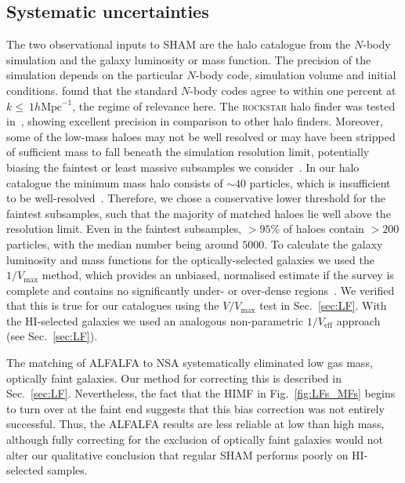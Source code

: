 \documentclass[usenatbib,useAMS]{mnras}
\newcommand{\HI}{\ensuremath{\mathrm{H}\scriptstyle\mathrm{I}}}
\begin{document}
\subsection{Systematic uncertainties}\label{sec:systematic_uncertanties}

The two observational inputs to \ac{SHAM} are the halo catalogue from the $N$-body simulation and the galaxy luminosity or mass function. The precision of the simulation depends on the particular $N$-body code, simulation volume and initial conditions. \citet{Schneider} found that the standard $N$-body codes agree to within one percent at $k \leq~1 h\mathrm{Mpc}^{-1}$, the regime of relevance here. The \textsc{rockstar} halo finder was tested in~\citet{Knebe2011}, showing excellent precision in comparison to other halo finders. Moreover, some of the low-mass haloes may not be well resolved or may have been stripped of sufficient mass to fall beneath the simulation resolution limit, potentially biasing the faintest or least massive subsamples we consider~\citep{Contreras2020}. In our halo catalogue the minimum mass halo consists of $\sim 40$ particles, which is insufficient to be well-resolved~\citep{Diemer2015}. Therefore, we chose a conservative lower threshold for the faintest subsamples, such that the majority of matched haloes lie well above the resolution limit. Even in the faintest subsamples, $>95\%$ of haloes contain $>200$ particles, with the median number being around $5000$. To calculate the galaxy luminosity and mass functions for the optically-selected galaxies we used the  $1/V_{\max}$ method, which provides an unbiased, normalised estimate if the survey is complete and contains no significantly under- or over-dense regions~\citep{Efstathiou:1988}. We verified that this is true for our catalogues using the $V/V_{\max}$ test in Sec.~\ref{sec:LF}. With the $\HI$-selected galaxies we used an analogous non-parametric $1/V_{\mathrm{eff}}$ approach (see Sec.~\ref{sec:LF}).

The matching of ALFALFA to \ac{NSA} systematically eliminated low gas mass, optically faint galaxies. Our method for correcting this is described in Sec.~\ref{sec:LF}. Nevertheless, the fact that the \ac{HIMF} in Fig.~\ref{fig:LFs_MFs} begins to turn over at the faint end suggests that this bias correction was not entirely successful. Thus, the ALFALFA results are less reliable at low than high mass, although fully correcting for the exclusion of optically faint galaxies would not alter our qualitative conclusion that regular \ac{SHAM} performs poorly on HI-selected samples.
\end{document}
